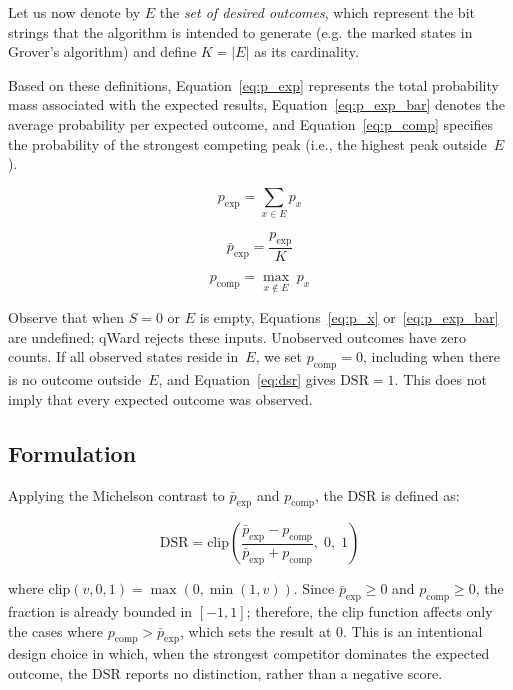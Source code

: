 \documentclass[pdflatex,sn-mathphys-num]{sn-jnl}
\theoremstyle{thmstyleone}%
\theoremstyle{thmstyletwo}%
\theoremstyle{thmstylethree}%
\begin{document}
Let us now denote by $E$ the \emph{set of desired outcomes}, which represent the bit strings that the algorithm is intended to generate (e.g. the marked states in Grover's algorithm) and define $K = |E|$ as its cardinality.

Based on these definitions, Equation~\eqref{eq:p_exp} represents the total probability mass associated with the expected results, Equation~\eqref{eq:p_exp_bar} denotes the average probability per expected outcome, and Equation~\eqref{eq:p_comp} specifies the probability of the strongest competing peak (i.e., the highest peak outside~$E$).

\begin{equation}
\label{eq:p_exp}
    p_{\text{exp}} = \sum_{x \in E} p_x
\end{equation}

\begin{equation}
\label{eq:p_exp_bar}
    \bar{p}_{\text{exp}} = \frac{p_{\text{exp}}}{K}
\end{equation}

\begin{equation}
\label{eq:p_comp}
    p_{\text{comp}} = \max_{x \notin E}\; p_x
\end{equation}

Observe that when $S=0$ or $E$ is empty, Equations~\eqref{eq:p_x} or~\eqref{eq:p_exp_bar} are undefined; qWard rejects these inputs. Unobserved outcomes have zero counts. If all observed states reside in~$E$, we set $p_{\text{comp}}=0$, including when there is no outcome outside~$E$, and Equation~\eqref{eq:dsr} gives $\mathrm{DSR}=1$. This does not imply that every expected outcome was observed.

\subsection{Formulation}

Applying the Michelson contrast to $\bar{p}_{\text{exp}}$ and $p_{\text{comp}}$, the DSR is defined as:

\begin{equation}
\label{eq:dsr}
\mathrm{DSR} = \mathrm{clip}\!\left(
\frac{\bar{p}_{\text{exp}} - p_{\text{comp}}}
     {\bar{p}_{\text{exp}} + p_{\text{comp}}},\; 0,\; 1\right)
\end{equation}

where $\mathrm{clip}(v, 0, 1) = \max(0, \min(1, v))$. Since $\bar{p}_{\text{exp}} \geq 0$ and $p_{\text{comp}} \geq 0$, the fraction is already bounded in $[-1, 1]$; therefore, the clip function affects only the cases where $p_{\text{comp}} > \bar{p}_{\text{exp}}$, which sets the result at 0. This is an intentional design choice in which, when the strongest competitor dominates the expected outcome, the DSR reports no distinction, rather than a negative score.
\end{document}
